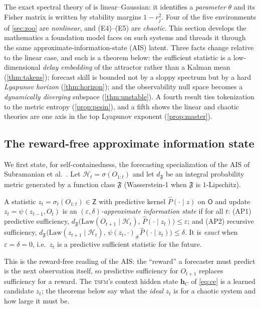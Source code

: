 \documentclass[10pt]{article}
\theoremstyle{plain}
\theoremstyle{definition}
\theoremstyle{remark}
\newcommand{\Os}{\mathsf{O}}
\newcommand{\Zs}{\mathsf{Z}}
\newcommand{\Fc}{\mathfrak{F}}
\newcommand{\eps}{\varepsilon}
\newcommand{\TSFM}{\textsc{tsfm}}
\begin{document}
The exact spectral theory of  is
linear--Gaussian: it identifies a \emph{parameter} $\theta$ and its Fisher matrix
is written by stability margins $1-r_j^2$. Four of the five environments of
\cref{sec:zoo} are \emph{nonlinear}, and (E4)--(E5) are \emph{chaotic}. This
section develops the mathematics a foundation model faces on such systems and
threads it through the same approximate-information-state (AIS) latent. Three
facts change relative to the linear case, and each is a theorem below: the
sufficient statistic is a low-dimensional \emph{delay embedding} of the attractor
rather than a Kalman mean (\cref{thm:takens}); forecast skill is bounded not by a
sloppy spectrum but by a hard \emph{Lyapunov horizon} (\cref{thm:horizon}); and
the observability null space becomes a \emph{dynamically diverging} subspace
(\cref{thm:unstable}). A fourth result ties tokenization to the metric entropy
(\cref{prop:pesin}), and a fifth shows the linear and chaotic theories are one
axis in the top Lyapunov exponent (\cref{prop:master}).

\subsection{The reward-free approximate information state}
We first state, for self-containedness, the forecasting specialization of the
AIS of Subramanian et al.~\cite{ais2022}. Let $\mathcal H_t=\sigma(O_{1:t})$ and
let $d_{\Fc}$ be an integral probability metric generated by a function class
$\Fc$ (Wasserstein-1 when $\Fc$ is $1$-Lipschitz).

\begin{definition}[$(\eps,\delta)$-AIS for forecasting]\label{def:ais}
A statistic $z_t=\sigma_t(O_{1:t})\in\Zs$ with predictive kernel $\hat
P(\cdot\mid z)$ on $\Os$ and update $z_{t}=\psi(z_{t-1},O_t)$ is an
\emph{$(\eps,\delta)$-approximate information state} if for all $t$:
\textup{(AP1)} predictive sufficiency,
$d_{\Fc}\big(\mathrm{Law}(O_{t+1}\mid\mathcal H_t),\,\hat P(\cdot\mid z_t)\big)
\le\eps$; and \textup{(AP2)} recursive sufficiency,
$d_{\Fc}\big(\mathrm{Law}(z_{t+1}\mid\mathcal H_t),\,\psi(z_t,\cdot)_\#\hat
P(\cdot\mid z_t)\big)\le\delta$. It is \emph{exact} when $\eps=\delta=0$, i.e.\
$z_t$ is a predictive sufficient statistic for the future.
\end{definition}

This is the reward-free reading of the AIS: the ``reward'' a forecaster must
predict is the next observation itself, so predictive sufficiency for $O_{t+1}$
replaces sufficiency for a reward. The \TSFM's context hidden state $\mathbf h_C$
of \eqref{eq:ce} is a learned candidate $z_t$; the theorems below say what the
\emph{ideal} $z_t$ is for a chaotic system and how large it must be.
\end{document}
